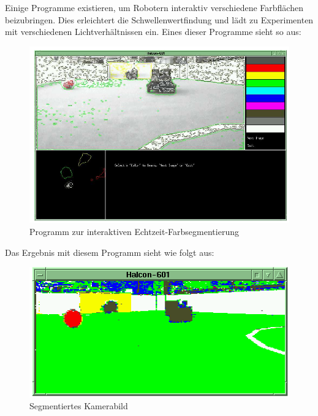 \documentclass[a4paper,12pt]{article}
\begin{document}
\newpage
Einige Programme existieren, um Robotern interaktiv verschiedene Farbflächen
beizubringen. Dies erleichtert die Schwellenwertfindung und lädt zu Experimenten
mit verschiedenen Lichtverhältnissen ein. Eines dieser Programme sieht so aus:
\begin{figure}[H]
\includegraphics[scale=0.5]{training-tool.png}
\caption{Programm zur interaktiven Echtzeit-Farbsegmentierung}
\label{fig:color-seg-tool}
\end{figure}

Das Ergebnis mit diesem Programm sieht wie folgt aus:
\begin{figure}[H]
\includegraphics[scale=0.5]{segmented-view.png}
\caption{Segmentiertes Kamerabild}
\label{fig:color-seg-cam}
\end{figure}
\end{document}
